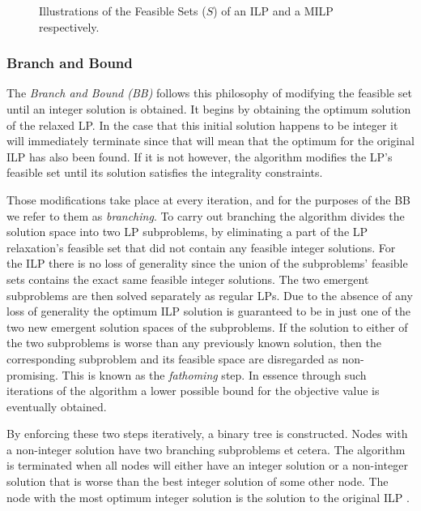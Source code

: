 \begin{figure}
{\begin{tikzpicture}[thick, scale=0.9]
    \end{tikzpicture}}
    \caption{Illustrations of the Feasible Sets ($S$) of an ILP and a MILP respectively.}%
    \label{fig:Integer Programming figure}%
\end{figure}


\subsubsection*{Branch and Bound}
The \textit{Branch and Bound (BB)} follows this philosophy of modifying the feasible set until an integer solution is obtained. It begins by obtaining the optimum solution of the relaxed LP. In the case that this initial solution happens to be integer it will immediately terminate since that will mean that the optimum for the original ILP has also been found. If it is not however, the algorithm modifies the LP’s feasible set until its solution satisfies the integrality constraints. \par

\vspace{\baselineskip}
\noindent
Those modifications take place at every iteration, and for the purposes of the BB we refer to them as \textit{branching}. To carry out branching the algorithm divides the solution space into two LP subproblems, by eliminating a part of the LP relaxation’s feasible set that did not contain any feasible integer solutions. For the ILP there is no loss of generality since the union of the subproblems’ feasible sets contains the exact same feasible integer solutions. The two emergent subproblems are then solved separately as regular LPs. Due to the absence of any loss of generality the optimum ILP solution is guaranteed to be in just one of the two new emergent solution spaces of the subproblems. If the solution to either of the two subproblems is worse than any previously known solution, then the corresponding subproblem and its feasible space are disregarded as non-promising. This is known as the \textit{fathoming} step. In essence through such iterations of the algorithm a lower possible bound for the objective value is eventually obtained. \par

\vspace{\baselineskip}
\noindent
By enforcing these two steps iteratively, a binary tree is constructed. Nodes with a non-integer solution have two branching subproblems et cetera. The algorithm is terminated when all nodes will either have an integer solution or a non-integer solution that is worse than the best integer solution of some other node. The node with the most optimum integer solution is the solution to the original ILP \cite{DUMMY:2}.   \par

